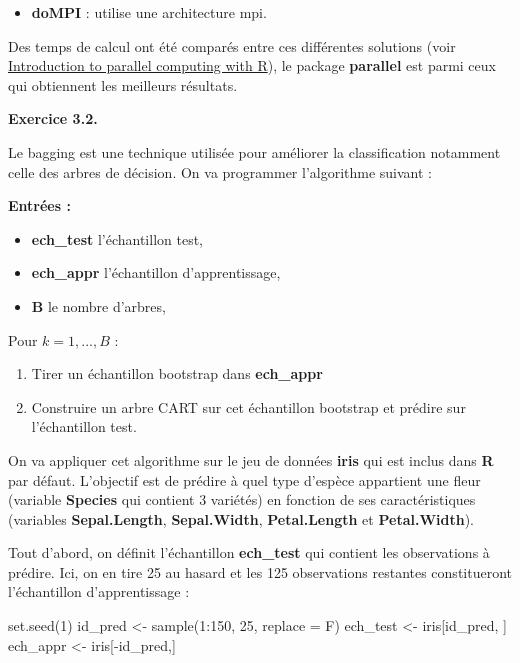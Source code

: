 \documentclass[
]{book}
\newenvironment{Shaded}{\begin{snugshade}}{\end{snugshade}}
\newcommand{\AttributeTok}[1]{\textcolor[rgb]{0.77,0.63,0.00}{#1}}
\newcommand{\DecValTok}[1]{\textcolor[rgb]{0.00,0.00,0.81}{#1}}
\newcommand{\FunctionTok}[1]{\textcolor[rgb]{0.00,0.00,0.00}{#1}}
\newcommand{\NormalTok}[1]{#1}
\newcommand{\OtherTok}[1]{\textcolor[rgb]{0.56,0.35,0.01}{#1}}
\newcommand{\SpecialCharTok}[1]{\textcolor[rgb]{0.00,0.00,0.00}{#1}}
\providecommand{\tightlist}{%
  \setlength{\itemsep}{0pt}\setlength{\parskip}{0pt}}
\theoremstyle{definition}
\theoremstyle{definition}
\theoremstyle{definition}
\theoremstyle{definition}
\theoremstyle{remark}
\begin{document}
\begin{itemize}
\tightlist
\item
  \textbf{doMPI} : utilise une architecture mpi.
\end{itemize}

Des temps de calcul ont été comparés entre ces différentes solutions (voir \href{https://rawgit.com/PPgp/useR2017public/master/tutorial.html}{Introduction to parallel computing with R}), le package \textbf{parallel} est parmi ceux qui obtiennent les meilleurs résultats.

\textbf{Exercice 3.2.}

Le bagging est une technique utilisée pour améliorer la classification notamment celle des arbres de décision. On va programmer l'algorithme suivant :

\textbf{Entrées :}

\begin{itemize}
\tightlist
\item
  \textbf{ech\_test} l'échantillon test,
\item
  \textbf{ech\_appr} l'échantillon d'apprentissage,
\item
  \textbf{B} le nombre d'arbres,
\end{itemize}

Pour \(k = 1, ..., B\) :

\begin{enumerate}
\def\labelenumi{\arabic{enumi}.}
\tightlist
\item
  Tirer un échantillon bootstrap dans \textbf{ech\_appr}
\item
  Construire un arbre CART sur cet échantillon bootstrap et prédire sur l'échantillon test.
\end{enumerate}

On va appliquer cet algorithme sur le jeu de données \textbf{iris} qui est inclus dans \textbf{R} par défaut. L'objectif est de prédire à quel type d'espèce appartient une fleur (variable \textbf{Species} qui contient 3 variétés) en fonction de ses caractéristiques (variables \textbf{Sepal.Length}, \textbf{Sepal.Width}, \textbf{Petal.Length} et \textbf{Petal.Width}).

Tout d'abord, on définit l'échantillon \textbf{ech\_test} qui contient les observations à prédire. Ici, on en tire 25 au hasard et les 125 observations restantes constitueront l'échantillon d'apprentissage :

\begin{Shaded}
\begin{Highlighting}[]
\FunctionTok{set.seed}\NormalTok{(}\DecValTok{1}\NormalTok{)}
\NormalTok{id\_pred }\OtherTok{\textless{}{-}} \FunctionTok{sample}\NormalTok{(}\DecValTok{1}\SpecialCharTok{:}\DecValTok{150}\NormalTok{, }\DecValTok{25}\NormalTok{, }\AttributeTok{replace =}\NormalTok{ F)}
\NormalTok{ech\_test }\OtherTok{\textless{}{-}}\NormalTok{ iris[id\_pred, ]}
\NormalTok{ech\_appr }\OtherTok{\textless{}{-}}\NormalTok{ iris[}\SpecialCharTok{{-}}\NormalTok{id\_pred,]}
\end{Highlighting}
\end{Shaded}
\end{document}
